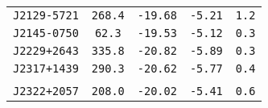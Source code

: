 \begin{longtable}{ l | c | c | c | c }
\scriptsize{\tt{J2129-5721}} & \scriptsize{\tt{268.4}} & \scriptsize{\tt{-19.68}} &
\scriptsize{\tt{-5.21}} & \scriptsize{\tt{1.2}} \\[-16pt]
\scriptsize{\tt{J2145-0750}} & \scriptsize{\tt{62.3}} & \scriptsize{\tt{-19.53}} &
\scriptsize{\tt{-5.12}} & \scriptsize{\tt{0.3}} \\[-16pt]
\scriptsize{\tt{J2229+2643}} & \scriptsize{\tt{335.8}} & \scriptsize{\tt{-20.82}} &
\scriptsize{\tt{-5.89}} & \scriptsize{\tt{0.3}} \\[-16pt]
\scriptsize{\tt{J2317+1439}} & \scriptsize{\tt{290.3}} & \scriptsize{\tt{-20.62}} &
\scriptsize{\tt{-5.77}} & \scriptsize{\tt{0.4}} \\[-16pt]
\\[-20pt] 
\scriptsize{\tt{J2322+2057}} & \scriptsize{\tt{208.0}} & \scriptsize{\tt{-20.02}} &
\scriptsize{\tt{-5.41}} & \scriptsize{\tt{0.6}} \\[-16pt]
\end{longtable}